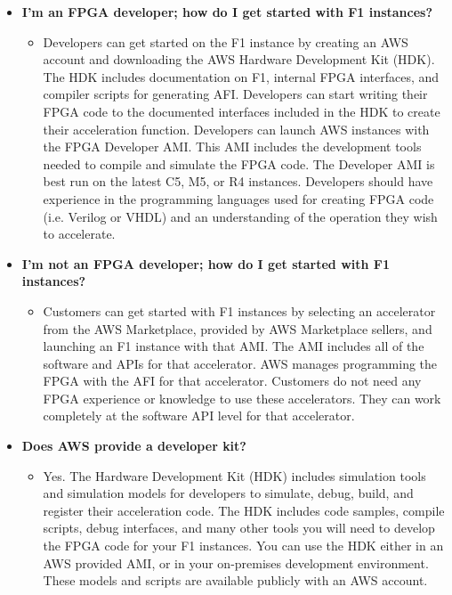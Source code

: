 \documentclass[a4paper]{article}
\begin{document}
\begin{itemize}
        \item[\ding{42}]
        \label{I'm an FPGA developer; how do I get started with F1 instances?}
        \hypertarget{I'm an FPGA developer; how do I get started with F1 instances?}{\textbf{I'm an FPGA developer; how do I get started with F1 instances?}}
        \begin{itemize}
            \item[\ding{45}] Developers can get started on the F1 instance by creating an AWS account and downloading the AWS Hardware Development Kit (HDK). The HDK includes documentation on F1, internal FPGA interfaces, and compiler scripts for generating AFI. Developers can start writing their FPGA code to the documented interfaces included in the HDK to create their acceleration function. Developers can launch AWS instances with the FPGA Developer AMI. This AMI includes the development tools needed to compile and simulate the FPGA code. The Developer AMI is best run on the latest C5, M5, or R4 instances. Developers should have experience in the programming languages used for creating FPGA code (i.e. Verilog or VHDL) and an understanding of the operation they wish to accelerate.
        \end{itemize}

        \item[\ding{42}]
        \label{I'm not an FPGA developer; how do I get started with F1 instances?}
        \hypertarget{I'm not an FPGA developer; how do I get started with F1 instances?}{\textbf{I'm not an FPGA developer; how do I get started with F1 instances?}}
        \begin{itemize}
            \item[\ding{45}] Customers can get started with F1 instances by selecting an accelerator from the AWS Marketplace, provided by AWS Marketplace sellers, and launching an F1 instance with that AMI. The AMI includes all of the software and APIs for that accelerator. AWS manages programming the FPGA with the AFI for that accelerator. Customers do not need any FPGA experience or knowledge to use these accelerators. They can work completely at the software API level for that accelerator.
        \end{itemize}

        \item[\ding{42}]
        \label{Does AWS provide a developer kit?}
        \hypertarget{Does AWS provide a developer kit?}{\textbf{Does AWS provide a developer kit?}}
        \begin{itemize}
            \item[\ding{45}] Yes. The Hardware Development Kit (HDK) includes simulation tools and simulation models for developers to simulate, debug, build, and register their acceleration code. The HDK includes code samples, compile scripts, debug interfaces, and many other tools you will need to develop the FPGA code for your F1 instances. You can use the HDK either in an AWS provided AMI, or in your on-premises development environment. These models and scripts are available publicly with an AWS account.
        \end{itemize}


\end{itemize}
\end{document}
